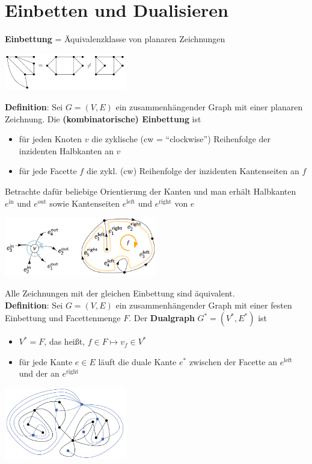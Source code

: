 \section{Einbetten und Dualisieren}

\textbf{Einbettung} = Äquivalenzklasse von planaren Zeichnungen
\begin{center}
	\includegraphics[width=0.4\textwidth]{images/einbettung.png}
\end{center}

\textbf{Definition}: Sei $G = (V, E)$ ein zusammenhängender Graph mit einer planaren Zeichnung.
Die \textbf{(kombinatorische) Einbettung} ist 
\begin{itemize}
	\item für jeden Knoten $v$ die zyklische (cw = \enquote{clockwise}) Reihenfolge der inzidenten Halbkanten an $v$
	\item für jede Facette $f$ die zykl. (cw) Reihenfolge der inzidenten Kantenseiten an $f$
\end{itemize}

Betrachte dafür beliebige Orientierung der Kanten und man erhält Halbkanten $e^{\text{in}}$ und $e^{\text{out}}$ sowie Kantenseiten $e^{\text{left}}$ und $e^{\text{right}}$ von $e$
\begin{center}
	\includegraphics[width=0.5\textwidth]{images/einbettung-2.png}
\end{center}
\bigskip
Alle Zeichnungen mit der gleichen Einbettung sind äquivalent.\\

\textbf{Definition}: Sei $G = (V, E)$ ein zusammenhängender Graph mit einer festen Einbettung und Facettenmenge $F$. 
Der \textbf{Dualgraph} $G^* = (V^*, E^*)$ ist
\begin{itemize}
	\item $V^* = F$, das heißt, $f \in F \mapsto v_f \in V^*$
	\item für jede Kante $e \in E$ läuft die duale Kante $e^*$ zwischen der Facette an $e^{\text{left}}$ und der an $e^{\text{right}}$
\end{itemize}
\begin{center}
	\includegraphics[width=0.4\textwidth]{images/dualgraph.png}
\end{center}

